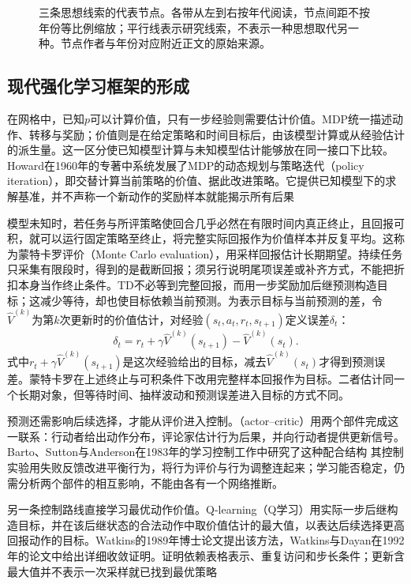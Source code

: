 \begin{figure}[htbp]
  \centering
  
  \caption{三条思想线索的代表节点。各带从左到右按年代阅读，节点间距不按年份等比例缩放；平行线表示研究线索，不表示一种思想取代另一种。节点作者与年份对应附近正文的原始来源。}
  \label{fig:rl-overview-history}
\end{figure}

\subsection{现代强化学习框架的形成}
\label{sec:rl-overview-modern}

在网格中，已知$p$可以计算价值，只有一步经验则需要估计价值。MDP统一描述动作、转移与奖励；价值则是在给定策略和时间目标后，由该模型计算或从经验估计的派生量。这一区分使已知模型计算与未知模型估计能够放在同一接口下比较。Howard在1960年的专著中系统发展了MDP的动态规划与策略迭代（policy iteration），即交替计算当前策略的价值、据此改进策略。它提供已知模型下的求解基准，并不声称一个新动作的奖励样本就能揭示所有后果

模型未知时，若任务与所评策略使回合几乎必然在有限时间内真正终止，且回报可积，就可以运行固定策略至终止，将完整实际回报作为价值样本并反复平均。这称为蒙特卡罗评价（Monte Carlo evaluation），用采样回报估计长期期望。持续任务只采集有限段时，得到的是截断回报；须另行说明尾项误差或补齐方式，不能把折扣本身当作终止条件。TD不必等到完整回报，而用一步奖励加后继预测构造目标；这减少等待，却也使目标依赖当前预测。为表示目标与当前预测的差，令$\widehat V^{(k)}$为第$k$次更新时的价值估计，对经验$(s_t,a_t,r_t,s_{t+1})$定义误差$\delta_t$：
\[
  \delta_t=r_t+\gamma\widehat V^{(k)}(s_{t+1})
                    -\widehat V^{(k)}(s_t).
\]
式中$r_t+\gamma\widehat V^{(k)}(s_{t+1})$是这次经验给出的目标，减去$\widehat V^{(k)}(s_t)$才得到预测误差。蒙特卡罗在上述终止与可积条件下改用完整样本回报作为目标。二者估计同一个长期对象，但等待时间、抽样波动和预测误差进入目标的方式不同。

预测还需影响后续选择，才能从评价进入控制。（actor--critic）用两个部件完成这一联系：行动者给出动作分布，评论家估计行为后果，并向行动者提供更新信号。Barto、Sutton与Anderson在1983年的学习控制工作中研究了这种配合结构
其控制实验用失败反馈改进平衡行为，将行为评价与行为调整连起来；学习能否稳定，仍需分析两个部件的相互影响，不能由各有一个网络推断。

另一条控制路线直接学习最优动作价值。Q-learning（Q学习）用实际一步后继构造目标，并在该后继状态的合法动作中取价值估计的最大值，以表达后续选择更高回报动作的目标。Watkins的1989年博士论文提出该方法，Watkins与Dayan在1992年的论文中给出详细收敛证明。证明依赖表格表示、重复访问和步长条件；更新含最大值并不表示一次采样就已找到最优策略

